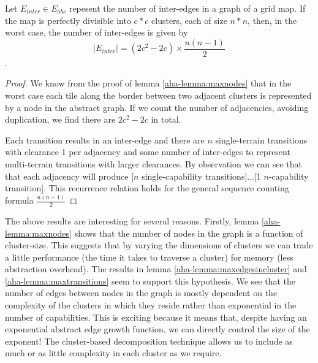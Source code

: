 \begin{lemma}
\label{aha-lemma:maxtransitions}
Let $E_{inter} \in E_{abs}$ repesent the number of inter-edges in a graph of a grid map. If the map is perfectly divisible into $c*c$ clusters, each of size $n*n$, then, in the worst case, the number of inter-edges is given by 
$$|E_{inter}| = (2c^2 - 2c)\times \frac{n(n-1)}{2}$$.
\end{lemma}

\begin{proof}
We know from the proof of lemma \ref{aha-lemma:maxnodes} that in the worst case each tile along the border between two adjacent clusters is represented by a node in the abstract graph. 
If we count the number of adjacencies, avoiding duplication, we find there are $2c^2 - 2c$ in total.
\par \indent
Each transition results in an inter-edge and there are $n$ single-terrain transitions with clearance 1 per adjacency and some number of inter-edges to represent multi-terrain transitions with larger clearances. 
By observation we can see that that each adjacency will produce [$n$ single-capability transitions]...[1 $n$-capability transition]. 
This recurrence relation holds for the general sequence counting formula $\frac{n(n-1)}{2}$
\end{proof}

The above results are interesting for several reasons. 
Firstly, lemma \ref{aha-lemma:maxnodes} shows that the number of nodes in the graph is a function of cluster-size. This suggests that by varying the dimensions of clusters we can trade a little performance (the time it takes to traverse a cluster) for memory (less abstraction overhead).
The results in lemma \ref{aha-lemma:maxedgesincluster} and \ref{aha-lemma:maxtransitions} seem to support this hypothesis. 
We see that the number of edges between nodes in the graph is mostly dependent on the complexity of the clusters in which they reside rather than exponential in the number of capabilities. 
This is exciting because it means that, despite having an exponential abstract edge growth function, we can directly control the size of the exponent! 
The cluster-based decomposition technique allows us to include as much or as little complexity in each cluster as we require.
